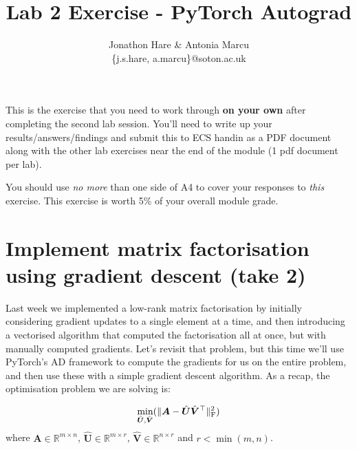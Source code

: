 \documentclass[a4paper]{article}
\begin{document}
\lstset{language=Python,upquote=true}

\setlength{\leftskip}{20pt}
\title{Lab 2 Exercise - PyTorch Autograd}
\author{Jonathon Hare \& Antonia Marcu\\\{j.s.hare, a.marcu\}@soton.ac.uk}

\maketitle


This is the exercise that you need to work through \textbf{on your own} after completing the second lab session. You'll need to write up your results/answers/findings and submit this to ECS handin as a PDF document along with the other lab exercises near the end of the module (1 pdf document per lab). 

You should use \emph{no more} than one side of A4 to cover your responses to \emph{this} exercise. This exercise is worth 5\% of your overall module grade.

\section{Implement matrix factorisation using gradient descent (take 2)}\label{gd}

Last week we implemented a low-rank matrix factorisation by initially considering gradient updates to a single element at a time, and then introducing a vectorised algorithm that computed the factorisation all at once, but with manually computed gradients. Let's revisit that problem, but this time we'll use PyTorch's AD framework to compute the gradients for us on the entire problem, and then use these with a simple gradient descent algorithm. As a recap, the optimisation problem we are solving is:

\begin{equation}
	\min\limits_{\hat{\bm U}, \hat{\bm V}}( \| \bm A - \hat{\bm U}\hat{\bm V}^\top \|_{\rm F}^2 )
\end{equation}
where $\bm A \in \mathbb{R}^{m \times n}$, $\hat{\bm U} \in \mathbb{R}^{m \times r}$, $\hat{\bm V} \in \mathbb{R}^{n \times r}$ and $r<\min(m,n)$. 
\end{document}
